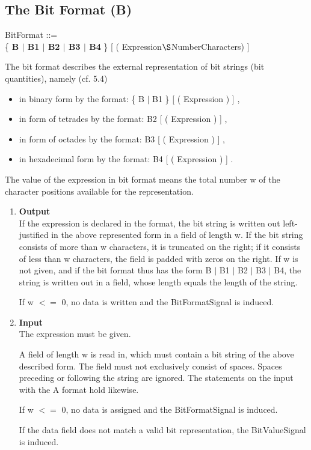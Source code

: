 \subsection{The Bit Format (B)}    %
\label{sec_dation_b_format}

BitFormat ::=\\
\x \{ {\bf B $\mid$ B1 $\mid$ B2 $\mid$ B3 $\mid$ B4} \} [ ( Expression$\S $NumberCharacters) ]

The bit format describes the external representation of bit strings (bit
quantities), namely (cf. 5.4)
\begin{itemize}
\item in binary form by the format: \{ B $\mid$ B1 \} [ ( Expression ) ] ,
\item in form of tetrades by the format: B2 [ ( Expression ) ] ,
\item in form of octades by the format: B3 [ ( Expression ) ] ,
\item in hexadecimal form by the format: B4 [ ( Expression ) ] .
\end{itemize}

The value of the expression in bit format means the total number w of
the character positions available for the representation.
\begin{enumerate}
\item {\bf Output}\\
If the expression is declared in the format, the bit string is written
out left-justified in the above represented form in a field of length
w. If the bit string consists of more than w characters, it is truncated
on the right; if it consists of less than w characters, the field is
padded with zeros on the right. If w is not given, and if the bit format
thus has the form B $\mid$ B1 $\mid$ B2 $\mid$ B3 $\mid$ B4, the string
is written out in a field, whose length equals the length of the
string.

\begin{added}
If w $<=$ 0, no data is written and the BitFormatSignal is induced.
\end{added}

\item {\bf Input}\\
The expression must be given.

A field of length w is read in, which must contain a bit string of the
above described form. The field must not exclusively consist of spaces.
Spaces preceding or following the string are ignored. The statements on
the input with the A format hold likewise.

\begin{added}
If w $<=$ 0, no data is assigned and the BitFormatSignal is induced.

If the data field does not match a valid bit representation, the
BitValueSignal is induced.
\end{added}
\end{enumerate}

